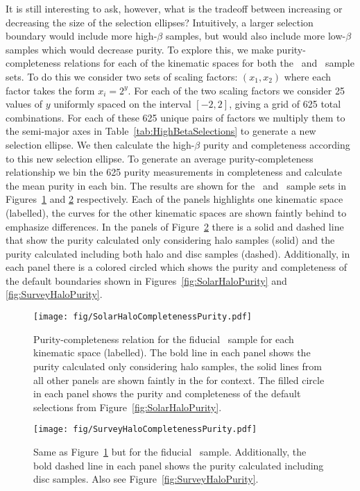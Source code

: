 It is still interesting to ask, however, what is the tradeoff between increasing or decreasing the size of the selection ellipses? Intuitively, a larger selection boundary would include more high-$\beta$ samples, but would also include more low-$\beta$ samples which would decrease purity. To explore this, we make purity-completeness relations for each of the kinematic spaces for both the \solar\ and \survey\ sample sets. To do this we consider two sets of scaling factors: $(x_{1},x_{2})$ where each factor takes the form $x_{i} = 2^{y}$. For each of the two scaling factors we consider 25 values of $y$ uniformly spaced on the interval $[-2,2]$, giving a grid of 625 total combinations. For each of these 625 unique pairs of factors we multiply them to the semi-major axes in Table~\ref{tab:HighBetaSelections} to generate a new selection ellipse. We then calculate the high-$\beta$ purity and completeness according to this new selection ellipse. To generate an average purity-completeness relationship we bin the 625 purity measurements in completeness and calculate the mean purity in each bin. The results are shown for the \solar\ and \survey\ sample sets in Figures~\ref{fig:SolarCPDiagram} and \ref{fig:SurveyCPDiagram} respectively. Each of the panels highlights one kinematic space (labelled), the curves for the other kinematic spaces are shown faintly behind to emphasize differences. In the panels of Figure~\ref{fig:SurveyCPDiagram} there is a solid and dashed line that show the purity calculated only considering halo samples (solid) and the purity calculated including both halo and disc samples (dashed). Additionally, in each panel there is a colored circled which shows the purity and completeness of the default boundaries shown in Figures~\ref{fig:SolarHaloPurity} and \ref{fig:SurveyHaloPurity}.

\begin{figure}
    \centering
    \texttt{[image: fig/SolarHaloCompletenessPurity.pdf]}
    \caption{Purity-completeness relation for the fiducial \solar\ sample for each kinematic space (labelled). The bold line in each panel shows the purity calculated only considering halo samples, the solid lines from all other panels are shown faintly in the for context. The filled circle in each panel shows the purity and completeness of the default selections from Figure~\ref{fig:SolarHaloPurity}.}
    \label{fig:SolarCPDiagram}
\end{figure}

\begin{figure}
    \centering
    \texttt{[image: fig/SurveyHaloCompletenessPurity.pdf]}
    \caption{Same as Figure~\ref{fig:SolarCPDiagram} but for the fiducial \survey\ sample. Additionally, the bold dashed line in each panel shows the purity calculated including disc samples. Also see Figure~\ref{fig:SurveyHaloPurity}.}
    \label{fig:SurveyCPDiagram}
\end{figure}

